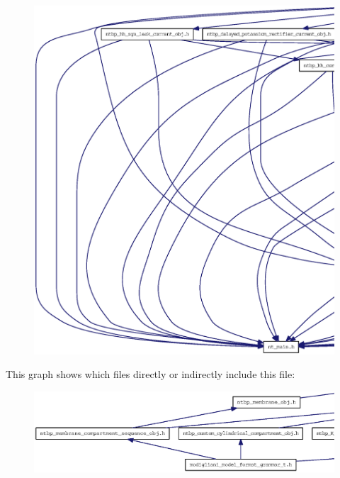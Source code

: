 \begin{figure}[H]
\begin{center}
\leavevmode
\includegraphics[width=400pt]{ntbp__membrane__compartment__obj_8h__incl}
\end{center}
\end{figure}
This graph shows which files directly or indirectly include this file:
\nopagebreak
\begin{figure}[H]
\begin{center}
\leavevmode
\includegraphics[width=400pt]{ntbp__membrane__compartment__obj_8h__dep__incl}
\end{center}
\end{figure}
